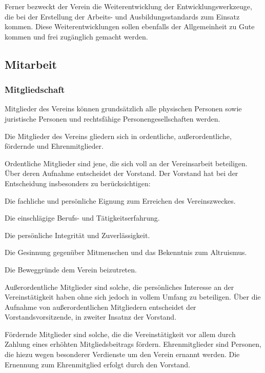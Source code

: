 \documentclass[ngerman,paper=a4,fontsize=8pt,headings=small,draft=no,parskip=half,noonelinecaption]{scrreprt}
\begin{document}
    Ferner bezweckt der Verein die Weiterentwicklung
    der Entwicklungswerkzeuge, die bei der Erstellung der
    Arbeits- und Ausbildungsstandards zum Einsatz kommen.
    Diese Weiterentwicklungen sollen ebenfalls der
    Allgemeinheit zu Gute kommen und frei zugänglich gemacht
    werden.
        

\subsection{Mitarbeit}

\subsubsection{Mitgliedschaft}
Mitglieder des Vereins können grundsätzlich alle physischen Personen sowie
juristische Personen und rechtsfähige
Personengesellschaften werden.

Die Mitglieder des Vereins gliedern sich in ordentliche,
außerordentliche, fördernde  und Ehrenmitglieder.

Ordentliche Mitglieder sind jene, die sich voll an der Vereinsarbeit
beteiligen. Über deren Aufnahme
entscheidet der Vorstand. Der Vorstand hat bei der Entscheidung insbesonders zu berücksichtigen:
\begin{inparaenum}
  \item Die fachliche und persönliche Eignung zum
  Erreichen des Vereinszweckes.
  \item Die einschlägige Berufs- und
  Tätigkeitserfahrung.
  \item Die persönliche Integrität und
  Zuverlässigkeit.
  \item Die Gesinnung gegenüber Mitmenschen und das
  Bekenntnis zum Altruismus.
  \item Die Beweggründe dem Verein beizutreten.
\end{inparaenum}

Außerordentliche Mitglieder sind solche, die persönliches Interesse an der
Vereinstätigkeit haben ohne sich jedoch in vollem Umfang zu beteiligen. Über die Aufnahme von außerordentlichen Mitgliedern
entscheidet der Vorstandsvorsitzende, in zweiter Insatnz der Vorstand.

Fördernde Mitglieder sind solche, die die
Vereinstätigkeit  vor allem durch Zahlung eines erhöhten Mitgliedsbeitrags
fördern.
Ehrenmitglieder sind Personen, die hiezu wegen besonderer
Verdienste  um den Verein ernannt werden. Die Ernennung zum Ehrenmitglied
erfolgt durch den Vorstand.
\end{document}
